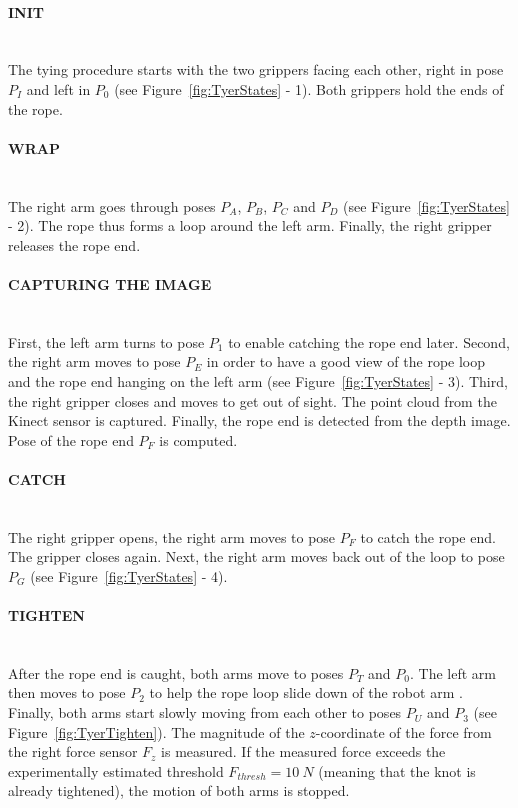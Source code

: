         \paragraph{INIT}~\\
        \noindent The tying procedure starts with the two grippers facing each other, right in pose $P_I$ and left in $P_0$ (see Figure~\ref{fig:TyerStates} - 1). Both grippers hold the ends of the rope.

        \paragraph{WRAP}~\\
        \noindent The right arm goes through poses $P_A$, $P_B$, $P_C$ and $P_D$ (see Figure~\ref{fig:TyerStates} - 2). The rope thus forms a loop around the left arm. Finally, the right gripper releases the rope end.

        \paragraph{CAPTURING THE IMAGE}~\\
        First, the left arm turns to pose $P_1$ to enable catching the rope end later. Second, the right arm moves to pose $P_E$ in order to have a good view of the rope loop and the rope end hanging on the left arm (see Figure~\ref{fig:TyerStates} - 3). Third, the right gripper closes and moves to get out of sight. The point cloud from the Kinect sensor is captured. Finally, the rope end is detected from the depth image. Pose of the rope end $P_F$ is computed.

        \paragraph{CATCH}~\\
        \noindent  The right gripper opens, the right arm moves to pose $P_F$ to catch the rope end. The gripper closes again. Next, the right arm moves back out of the loop to pose $P_G$ (see Figure~\ref{fig:TyerStates} - 4).

        \paragraph{TIGHTEN}~\\
        \noindent After the rope end is caught, both arms move to poses $P_T$ and $P_0$. The left arm then moves to pose $P_2$ to help the rope loop slide down of the robot arm . Finally, both arms start slowly moving from each other to poses $P_U$ and $P_3$ (see Figure~\ref{fig:TyerTighten}). The magnitude of the $z$-coordinate of the force from the right force sensor $F_z$ is measured. If the measured force exceeds the experimentally estimated threshold $F_{thresh} = \SI{10}{N}$ (meaning that the knot is already tightened), the motion of both arms is stopped.

